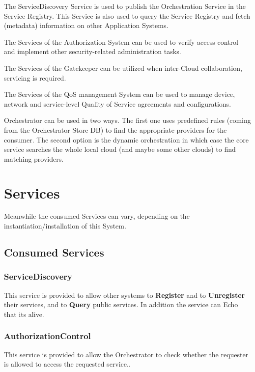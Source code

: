 \documentclass[a4paper]{arrowhead}
\newcommand{\spdef}[2]{{\textcolor{ArrowheadBlue}{#2\label{sec:services:produced:#1}}}}
\begin{document}
The ServiceDiscovery Service is used to publish the Orchestration Service in the Service Registry. This Service is also used to query the Service Registry and fetch (metadata) information on other Application Systems.

The Services of the Authorization System can be used to verify access control and implement other security-related administration tasks.

The Services of the Gatekeeper can be utilized when inter-Cloud collaboration, servicing is required.

The Services of the QoS management System can be used to manage device, network and service-level Quality of Service agreements and configurations.

Orchestrator can be used in two ways. The first one uses predefined rules (coming from the Orchestrator Store DB) to find the appropriate providers for the consumer. The second option is the dynamic orchestration in which case the core service searches the whole local cloud (and maybe some other clouds) to find matching providers.

\section{Services}
\label{sec:services}

Meanwhile the consumed Services can vary, depending on the instantiation/installation of this System. 
\subsection{Consumed Services}

\subsubsection{\spdef{ServiceDiscovery}{ServiceDiscovery}}

This service is provided to allow other systems to \textbf{Register}
and to \textbf{Unregister} their services, and to \textbf{Query}
public services. In addition the service can Echo that its alive.

\subsubsection{\spdef{AuthorizationControl}{AuthorizationControl}}

This service is provided to allow the Orchestrator to check whether the requester is allowed to access the requested service..
\end{document}
